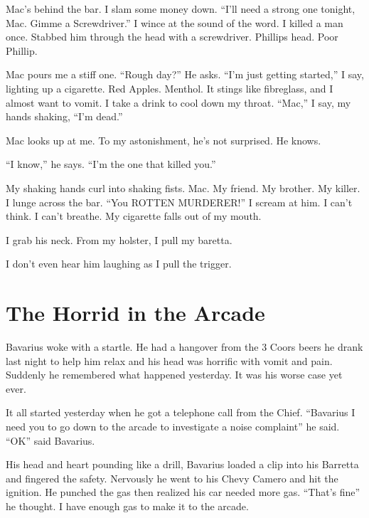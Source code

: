 Mac's behind the bar. I slam some money down. ``I'll need a strong
one tonight, Mac. Gimme a Screwdriver.'' I wince at the sound of the
word. I killed a man once. Stabbed him through the head with a
screwdriver. Phillips head. Poor Phillip.



Mac pours me a stiff one. ``Rough day?'' He asks. ``I'm just getting
started,'' I say, lighting up a cigarette. Red Apples. Menthol. It
stings like fibreglass, and I almost want to vomit. I take a drink
to cool down my throat. ``Mac,'' I say, my hands shaking, ``I'm
dead.''



Mac looks up at me. To my astonishment, he's not surprised. He
knows.



``I know,'' he says. ``I'm the one that killed you.''



My shaking hands curl into shaking fists. Mac. My friend. My
brother. My killer. I lunge across the bar. ``You ROTTEN MURDERER!''
I scream at him. I can't think. I can't breathe. My cigarette falls
out of my mouth.



I grab his neck. From my holster, I pull my baretta.



I don't even hear him laughing as I pull the trigger. 

 



\chapter{The Horrid in the Arcade}



Bavarius woke with a startle. He had a hangover from the 3 Coors
beers he drank last night to help him relax and his head was
horrific with vomit and pain. Suddenly he remembered what happened
yesterday. It was his worse case yet ever.



It all started yesterday when he got a telephone call from the
Chief. ``Bavarius I need you to go down to the arcade to investigate
a noise complaint'' he said. ``OK'' said Bavarius.



His head and heart pounding like a drill, Bavarius loaded a clip
into his Barretta and fingered the safety. Nervously he went to his
Chevy Camero and hit the ignition. He punched the gas then realized
his car needed more gas. ``That's fine'' he thought. I have enough
gas to make it to the arcade.



